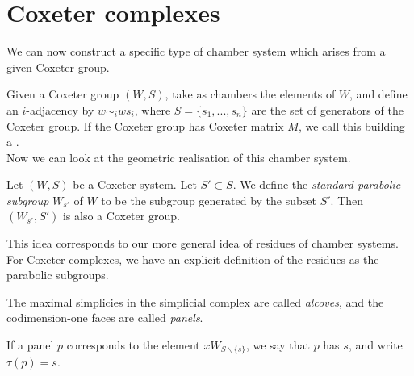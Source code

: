 \documentclass[11pt]{article}
\begin{document}
\section{Coxeter complexes}

We can now construct a specific type of chamber system which arises from a given Coxeter group. 

Given a Coxeter group $(W,S)$, take as chambers the elements of $W$, and define an $i$-adjacency by $w\sim_iws_i$, where $S=\{s_1,...,s_n\}$ are the set of generators of the Coxeter group. If the Coxeter group has Coxeter matrix $M$, we call this building a .\\

Now we can look at the geometric realisation of this chamber system. 



\begin{definition}
    Let $(W,S)$ be a Coxeter system. Let $S'\subset S$. We define the \textit{standard parabolic subgroup} $W_{s'}$ of $W$ to be the subgroup generated by the subset $S'$. Then $(W_{s'},S')$ is also a Coxeter group. 
\end{definition}

This idea corresponds to our more general idea of residues of chamber systems. For Coxeter complexes, we have an explicit definition of the residues as the parabolic subgroups. 



\begin{definition}
    The maximal simplicies in the simplicial complex are called \textit{alcoves}, and the codimension-one faces are called \textit{panels}.  
\end{definition}



\begin{definition}
    If a panel $p$ corresponds to the element $xW_{S\backslash \{s\}}$, we say that $p$ has  $s$, and write $\tau(p)=s$. 
\end{definition}
\end{document}
